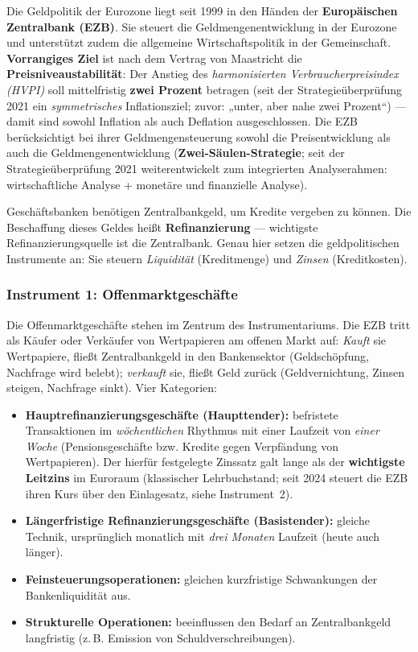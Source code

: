 \documentclass[11pt, a4paper]{article}
\begin{document}
Die Geldpolitik der Eurozone liegt seit 1999 in den Händen der \textbf{Europäischen
Zentralbank (EZB)}. Sie steuert die Geldmengenentwicklung in der Eurozone und unterstützt
zudem die allgemeine Wirtschaftspolitik in der Gemeinschaft. \textbf{Vorrangiges Ziel}
ist nach dem Vertrag von Maastricht die \textbf{Preisniveaustabilität}: Der Anstieg des
\emph{harmonisierten Verbraucherpreisindex (HVPI)} soll mittelfristig \textbf{zwei
Prozent} betragen (seit der Strategieüberprüfung 2021 ein \emph{symmetrisches}
Inflationsziel; zuvor: „unter, aber nahe zwei Prozent``) --- damit sind sowohl Inflation
als auch Deflation ausgeschlossen. Die EZB
berücksichtigt bei ihrer Geldmengensteuerung sowohl die Preisentwicklung als auch die
Geldmengenentwicklung (\textbf{Zwei-Säulen-Strategie}; seit der Strategieüberprüfung 2021
weiterentwickelt zum integrierten Analyserahmen: wirtschaftliche Analyse + monetäre und
finanzielle Analyse).

\begin{merksatz}
Geschäftsbanken benötigen Zentralbankgeld, um Kredite vergeben zu können. Die Beschaffung
dieses Geldes heißt \textbf{Refinanzierung} --- wichtigste Refinanzierungsquelle ist die
Zentralbank. Genau hier setzen die geldpolitischen Instrumente an: Sie steuern
\emph{Liquidität} (Kreditmenge) und \emph{Zinsen} (Kreditkosten).
\end{merksatz}

\subsubsection{Instrument 1: Offenmarktgeschäfte}

Die Offenmarktgeschäfte stehen im Zentrum des Instrumentariums. Die EZB tritt als Käufer
oder Verkäufer von Wertpapieren am offenen Markt auf: \emph{Kauft} sie Wertpapiere, fließt
Zentralbankgeld in den Bankensektor (Geldschöpfung, Nachfrage wird belebt); \emph{verkauft}
sie, fließt Geld zurück (Geldvernichtung, Zinsen steigen, Nachfrage sinkt). Vier Kategorien:

\begin{itemize}
  \item \textbf{Hauptrefinanzierungsgeschäfte (Haupttender):} befristete Transaktionen im
    \emph{wöchentlichen} Rhythmus mit einer Laufzeit von \emph{einer Woche}
    (Pensionsgeschäfte bzw. Kredite gegen Verpfändung von Wertpapieren). Der hierfür
    festgelegte Zinssatz galt lange als der \textbf{wichtigste Leitzins} im Euroraum
    (klassischer Lehrbuchstand; seit 2024 steuert die EZB ihren Kurs über den
    Einlagesatz, siehe Instrument~2).
  \item \textbf{Längerfristige Refinanzierungsgeschäfte (Basistender):} gleiche Technik,
    ursprünglich monatlich mit \emph{drei Monaten} Laufzeit (heute auch länger).
  \item \textbf{Feinsteuerungsoperationen:} gleichen kurzfristige Schwankungen der
    Bankenliquidität aus.
  \item \textbf{Strukturelle Operationen:} beeinflussen den Bedarf an Zentralbankgeld
    langfristig (z.\,B. Emission von Schuldverschreibungen).
\end{itemize}
\end{document}
